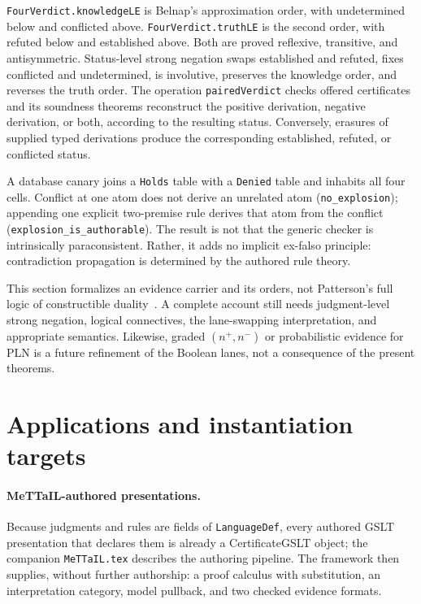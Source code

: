 \documentclass[]{article}
\theoremstyle{remark}
\newcommand{\code}[1]{\texttt{#1}}
\newcommand{\GSLT}{\textup{GSLT}}
\newcommand{\MeTTaIL}{\textup{MeTTaIL}}
\newcommand{\CertificateGSLT}{\textup{CertificateGSLT}}
\begin{document}
\code{FourVerdict.knowledgeLE} is Belnap's approximation order, with
undetermined below and conflicted above.  \code{FourVerdict.truthLE} is the
second order, with refuted below and established above.  Both are proved
reflexive, transitive, and antisymmetric.  Status-level strong negation swaps
established and refuted, fixes conflicted and undetermined, is involutive,
preserves the knowledge order, and reverses the truth order.  The operation
\code{pairedVerdict} checks offered certificates and its soundness theorems
reconstruct the positive derivation, negative derivation, or both, according
to the resulting status.  Conversely, erasures of supplied typed derivations
produce the corresponding established, refuted, or conflicted status.

A database canary joins a \code{Holds} table with a \code{Denied} table and
inhabits all four cells.  Conflict at one atom does not derive an unrelated
atom (\code{no\_explosion}); appending one explicit two-premise rule derives
that atom from the conflict (\code{explosion\_is\_authorable}).  The result is
not that the generic checker is intrinsically paraconsistent.  Rather, it
adds no implicit ex-falso principle: contradiction propagation is determined
by the authored rule theory.

This section formalizes an evidence carrier and its orders, not Patterson's
full logic of constructible duality~\cite{patterson1998constructible}.  A
complete account still needs judgment-level strong negation, logical
connectives, the lane-swapping interpretation, and appropriate semantics.
Likewise, graded $(n^+,n^-)$ or probabilistic evidence for PLN is a future
refinement of the Boolean lanes, not a consequence of the present theorems.

\section{Applications and instantiation targets}
\label{sec:applications}

\paragraph{\MeTTaIL{}-authored presentations.}
Because judgments and rules are fields of \code{LanguageDef}, every authored
\GSLT{} presentation that declares them is already a \CertificateGSLT{} object;
the companion \code{MeTTaIL.tex} describes the authoring pipeline.  The
framework then supplies, without further authorship: a proof calculus with
substitution, an interpretation category, model pullback, and two checked
evidence formats.
\end{document}
